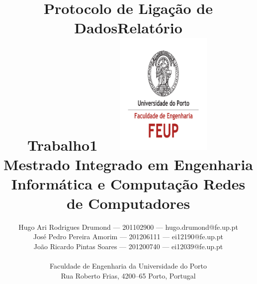 \documentclass[a4paper]{article}
\begin{document}
\setlength{\textwidth}{16cm} \setlength{\textheight}{22cm}

\title{\Huge\textbf{Protocolo de Ligação de
    Dados}\linebreak\linebreak\linebreak\linebreak \Large\textbf{Relatório \\
    Trabalho1}\linebreak\linebreak\linebreak\includegraphics[height=6cm,
    width=7cm]{feup.pdf}\linebreak \linebreak \Large{Mestrado Integrado em
    Engenharia Informática e Computação} \linebreak \linebreak \Large\textbf{Redes de
Computadores}\linebreak}

\author{Hugo Ari Rodrigues Drumond --- 201102900 --- hugo.drumond@fe.up.pt \\
    José Pedro Pereira Amorim --- 201206111 --- ei12190@fe.up.pt \\ João
    Ricardo Pintas Soares --- 201200740 ---
    ei12039@fe.up.pt\linebreak\linebreak\linebreak \\ \\ Faculdade de
    Engenharia da Universidade do Porto \\ Rua Roberto Frias, 4200--65 Porto,
    Portugal \linebreak\linebreak\linebreak \linebreak\linebreak\vspace{1cm}}
    \maketitle \thispagestyle{empty}
\end{document}
